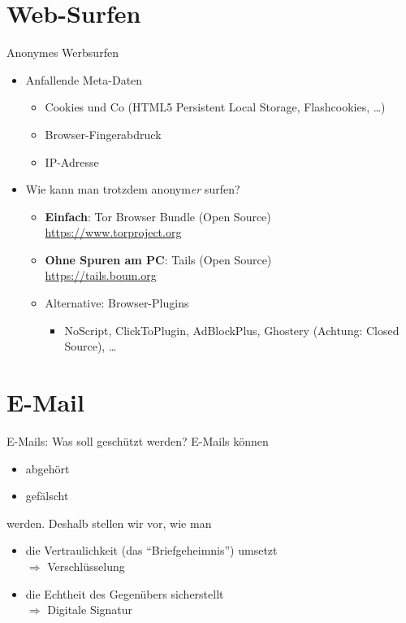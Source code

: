 \section{Web-Surfen}
  \begin{frame}{Anonymes Werbsurfen}
    \begin{itemize}
      \item Anfallende Meta-Daten
      \begin{itemize}
        \item Cookies und Co (HTML5 Persistent Local Storage, Flashcookies, \ldots)
        \item Browser-Fingerabdruck
        \item IP-Adresse
      \end{itemize}
      \item Wie kann man trotzdem anonym\textit{er} surfen?
      \begin{itemize}
        \item \textbf{Einfach}: Tor Browser Bundle (Open Source)\\ \url{https://www.torproject.org}\\[.5cm]
        \item \textbf{Ohne Spuren am PC}: Tails (Open Source)\\ \url{https://tails.boum.org}\\[.5cm]
        \item Alternative: Browser-Plugins
          \begin{itemize}
            \item NoScript, ClickToPlugin, AdBlockPlus, Ghostery (Achtung: Closed Source), \ldots 
          \end{itemize}
      \end{itemize}
    \end{itemize}
  \end{frame}

\section{E-Mail}
  \begin{frame}{E-Mails: Was soll geschützt werden?}
    E-Mails können
    \begin{itemize}
      \item abgehört
      \item gefälscht
    \end{itemize}
    werden. Deshalb stellen wir vor, wie man
    \begin{itemize}
      \item die Vertraulichkeit (das ``Briefgeheimnis'') umsetzt
      \\ $\Rightarrow$ Verschlüsselung
      \item die Echtheit des Gegenübers sicherstellt
      \\ $\Rightarrow$ Digitale Signatur
    \end{itemize}
  \end{frame}


